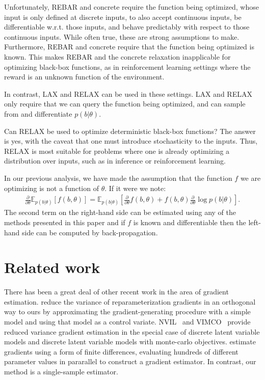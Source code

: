 \documentclass{article}
\newcommand{\E}{\mathbb{E}}
\newcommand{\PT}{\frac{\partial}{\partial \theta}}
\newcommand{\LAX}{{\textnormal{LAX}}}
\newcommand{\RELAX}{{\textnormal{RELAX}}}
\begin{document}
Unfortunately, REBAR and concrete require the function being optimized, whose input is only defined at discrete inputs, to also accept continuous inputs, be differentiable w.r.t. those inputs, and behave predictably with respect to those continuous inputs.
While often true, these are strong assumptions to make.
Furthermore, REBAR and concrete require that the function being optimized is known. 
This makes REBAR and the concrete relaxation inapplicable for optimizing black-box functions, as in reinforcement learning settings where the reward is an unknown function of the environment.

In contrast, \LAX{} and \RELAX{} can be used in these settings.
\LAX{} and \RELAX{} only require that we can query the function being optimized, and can sample from and differentiate $p(b|\theta)$.

Can \RELAX{} be used to optimize deterministic black-box functions?
The answer is yes, with the caveat that one must introduce stochasticity to the inputs.
Thus, \RELAX{} is most suitable for problems where one is already optimizing a distribution over inputs, such as in inference or reinforcement learning.

In our previous analysis, we have made the assumption that the function $f$ we are optimizing is not a function of $\theta$. If it were we note:
\begin{align}
\PT \E_{p(b|\theta)}[f(b, \theta)] = \E_{p(b|\theta)}\left[\PT f(b, \theta) + f(b, \theta)\PT \log p(b|\theta) \right].\nonumber
\end{align}
The second term on the right-hand side can be estimated using any of the methods presented in this paper and if $f$ is known and differentiable then the left-hand side can be computed by back-propagation.


\section{Related work}
There has been a great deal of other recent work in the area of gradient estimation.
\citet{miller2017reducing} reduce the variance of reparameterization gradients in an orthogonal way to ours by approximating the gradient-generating procedure with a simple model and using that model as a control variate.
NVIL~\citep{mnih2014neural} and VIMCO~\citep{mnih2016variational} provide reduced variance gradient estimation in the special case of discrete latent variable models and discrete latent variable models with monte-carlo objectives.
\citet{salimans2017evolution} estimate gradients using a form of finite differences, evaluating hundreds of different parameter values in pararallel to construct a gradient estimator.
In contrast, our method is a single-sample estimator.
\end{document}

